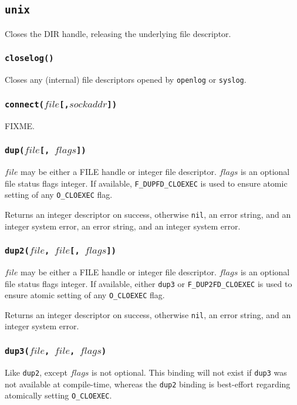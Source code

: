 \documentclass[11pt, oneside]{memoir}
\newcommand*{\nil}[0]{\texttt{nil}\xspace}
\newcommand*{\syscall}[1]{\texttt{#1}\xspace}
\newcommand*{\fn}[1]{\texttt{#1}\xspace}
\newcommand*{\otherwise}[1]{otherwise #1, an error string, and an integer system error}
\newcounter{toccols}
\newenvironment{Module}[1]{
	\subsection{\texttt{#1}}
	\addtocontents{toc}{
		\protect\begin{multicols}{\value{toccols}}
	}
}{
	\addtocontents{toc}{\protect\end{multicols}}
}
\begin{document}
\begin{Module}{unix}
Closes the DIR handle, releasing the underlying file descriptor.

\subsubsection[\fn{closelog}]{\fn{closelog()}}

Closes any (internal) file descriptors opened by \fn{openlog} or \fn{syslog}.

\subsubsection[\fn{connect}]{\fn{connect($file$[,$sockaddr$])}}

FIXME.

\subsubsection[\fn{dup}]{\fn{dup($file$[, $flags$])}}

$file$ may be either a FILE handle or integer file descriptor. $flags$ is an optional file status flags integer. If available, \syscall{F\_DUPFD\_CLOEXEC} is used to ensure atomic setting of any \syscall{O\_CLOEXEC} flag.

Returns an integer descriptor on success, \otherwise{\nil}, an error string, and an integer system error.

\subsubsection[\fn{dup2}]{\fn{dup2($file$, $file$[, $flags$])}}

$file$ may be either a FILE handle or integer file descriptor. $flags$ is an optional file status flags integer. If available, either \syscall{dup3} or \syscall{F\_DUP2FD\_CLOEXEC} is used to ensure atomic setting of any \syscall{O\_CLOEXEC} flag.

Returns an integer descriptor on success, \otherwise{\nil}.

\subsubsection[\fn{dup3}]{\fn{dup3($file$, $file$, $flags$)}}

Like \syscall{dup2}, except $flags$ is not optional. This binding will not exist if \syscall{dup3} was not available at compile-time, whereas the \syscall{dup2} binding is best-effort regarding atomically setting \syscall{O\_CLOEXEC}.


\end{Module}
\end{document}
